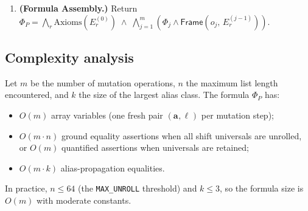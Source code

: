 \documentclass[11pt]{article}
\newcommand{\arrvar}[1]{\mathbf{a}_{#1}}
\newcommand{\lenvar}[1]{\ell_{#1}}
\newcommand{\Frame}[2]{\mathsf{Frame}(#1,\,#2)}
\begin{document}
\begin{construction}
\begin{enumerate}[label=\textbf{Phase~\arabic*},leftmargin=3.5em,nosep]
\begin{enumerate}[label=(\alph*),nosep]
                representative $\Pi(r)$.
          \item Compute $(\Phi_j, E_r^{(j)}) =
                \mathcal{E}(o_j, E_r^{(j-1)})$ using the encoding function
                (Definition~\ref{def:encfunc}).
          \item Compute the frame condition
                $\Frame{o_j}{E_r^{(j-1)}}$ (Definition~\ref{def:frame}).
          \item Propagate the updated encoding to all aliases:
                for each $r' \in R$ with $\Pi(r') = \Pi(r)$, assert
                $\arrvar{r'}^{(j)} = \arrvar{r}^{(j)}$ and
                $\lenvar{r'}^{(j)} = \lenvar{r}^{(j)}$.
          \item If $\lenvar{}^{(j-1)}$ is concrete and
                $\leq \texttt{MAX\_UNROLL}$, unroll quantified shift axioms
                into ground equalities.
        \end{enumerate}
  \item \textbf{(Formula Assembly.)} Return
        $\Phi_P = \bigwedge_{r} \mathrm{Axioms}(E_r^{(0)})
        \;\wedge\;
        \bigwedge_{j=1}^{m} (\Phi_j \wedge \Frame{o_j}{E_r^{(j-1)}})$.
\end{enumerate}
\end{construction}

\subsection{Complexity analysis}\label{sec:pipelinecomplexity}

\begin{proposition}\label{prop:pipelinecost}
Let $m$ be the number of mutation operations, $n$ the maximum list length
encountered, and $k$ the size of the largest alias class.  The formula
$\Phi_P$ has:
\begin{itemize}[nosep]
  \item $O(m)$ array variables (one fresh pair $(\arrvar{}, \lenvar{})$ per
        mutation step);
  \item $O(m \cdot n)$ ground equality assertions when all shift universals
        are unrolled, or $O(m)$ quantified assertions when universals are
        retained;
  \item $O(m \cdot k)$ alias-propagation equalities.
\end{itemize}
In practice, $n \leq 64$ (the \texttt{MAX\_UNROLL} threshold) and $k \leq 3$,
so the formula size is $O(m)$ with moderate constants.
\end{proposition}
\end{document}
